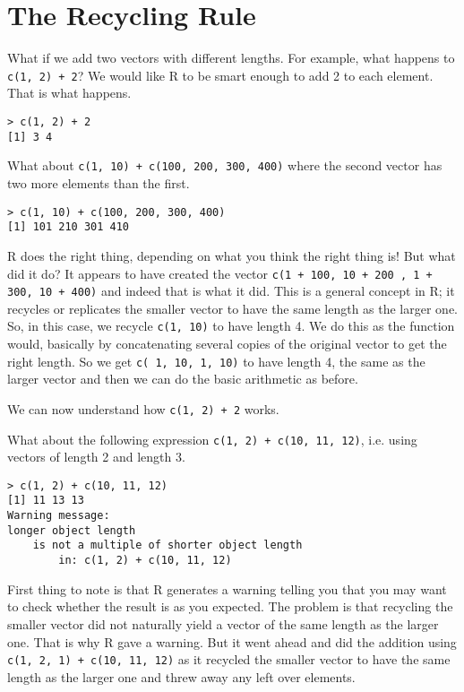 \section{The Recycling Rule}
What if we add two vectors with different lengths. For example, what
happens to \verb| c(1, 2) + 2|? We would like R to be smart enough to
add 2 to each element. That is what happens.
\begin{verbatim}
> c(1, 2) + 2
[1] 3 4
\end{verbatim}
What about \verb|c(1, 10) + c(100, 200, 300, 400)| where the second
vector has two more elements than the first.
\begin{verbatim}
> c(1, 10) + c(100, 200, 300, 400)
[1] 101 210 301 410
\end{verbatim}
R does the right thing, depending on what you think the right thing
is! But what did it do? It appears to have created the vector
\verb|c(1 + 100, 10 + 200 , 1 + 300, 10 + 400)| and indeed that is
what it did. This is a general concept in R; it recycles or replicates
the smaller vector to have the same length as the larger one. So, in
this case, we recycle \verb|c(1, 10)| to have length 4. We do this as
the function  would, basically by concatenating several
copies of the original vector to get the right length. So we get
\verb|c( 1, 10, 1, 10)| to have length 4, the same as the larger
vector and then we can do the basic arithmetic as before.

We can now understand how \verb|c(1, 2) + 2| works. 

What about the following expression \verb|c(1, 2) + c(10, 11, 12)|,
i.e. using vectors of length 2 and length 3.
\begin{verbatim}
> c(1, 2) + c(10, 11, 12)
[1] 11 13 13
Warning message: 
longer object length
	is not a multiple of shorter object length 
        in: c(1, 2) + c(10, 11, 12) 
\end{verbatim}
First thing to note is that R generates a warning telling you that you
may want to check whether the result is as you expected. The problem
is that recycling the smaller vector did not naturally yield a vector
of the same length as the larger one. That is why R gave a
warning. But it went ahead and did the addition using
\verb|c(1, 2, 1) + c(10, 11, 12)| as it recycled the smaller vector to
have the same length as the larger one and threw away any left over
elements.


 
